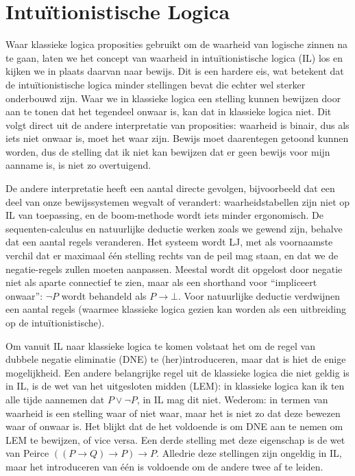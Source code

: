\section{Intu\"itionistische Logica}\label{sec:il}
Waar klassieke logica proposities gebruikt om de waarheid van logische zinnen na te gaan, laten we het concept van waarheid in intu\"itionistische logica (IL) los en kijken we in plaats daarvan naar bewijs. Dit is een hardere eis, wat betekent dat de intu\"itionistische logica minder stellingen bevat die echter wel sterker onderbouwd zijn. Waar we in klassieke logica een stelling kunnen bewijzen door aan te tonen dat het tegendeel onwaar is, kan dat in klassieke logica niet. Dit volgt direct uit de andere interpretatie van proposities: waarheid is binair, dus als iets niet onwaar is, moet het waar zijn. Bewijs moet daarentegen getoond kunnen worden, dus de stelling dat ik niet kan bewijzen dat er geen bewijs voor mijn aanname is, is niet zo overtuigend.

De andere interpretatie heeft een aantal directe gevolgen, bijvoorbeeld dat een deel van onze bewijssystemen wegvalt of verandert: waarheidstabellen zijn niet op IL van toepassing, en de boom-methode wordt iets minder ergonomisch. De sequenten-calculus en natuurlijke deductie werken zoals we gewend zijn, behalve dat een aantal regels veranderen. Het systeem \lk{} wordt \textsf{LJ}, met als voornaamste verchil dat er maximaal \'e\'en stelling rechts van de peil mag staan, en dat we de negatie-regels zullen moeten aanpassen. Meestal wordt dit opgelost door negatie niet als aparte connectief te zien, maar als een shorthand voor \enquote{impliceert onwaar}: $\neg P$ wordt behandeld als $P \to \bot$. Voor natuurlijke deductie verdwijnen een aantal regels (waarmee klassieke logica gezien kan worden als een uitbreiding op de intu\"itionistische).

Om vanuit IL naar klassieke logica te komen volstaat het om de regel van dubbele negatie eliminatie (DNE) te (her)introduceren, maar dat is hiet de enige mogelijkheid. Een andere belangrijke regel uit de klassieke logica die niet geldig is in IL, is de wet van het uitgesloten midden (LEM): in klassieke logica kan ik ten alle tijde aannemen dat $P \lor \neg P$, in IL mag dit niet. Wederom: in termen van waarheid is een stelling waar of niet waar, maar het is niet zo dat deze bewezen waar of onwaar is. Het blijkt dat de het voldoende is om DNE aan te nemen om LEM te bewijzen, of vice versa. Een derde stelling met deze eigenschap is de wet van Peirce $((P \to Q) \to P) \to P$. Alledrie deze stellingen zijn ongeldig in IL, maar het introduceren van \'e\'en is voldoende om de andere twee af te leiden.

